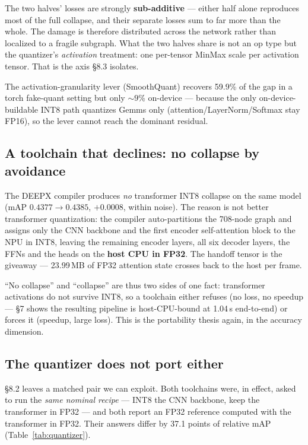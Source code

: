 \documentclass[11pt]{article}
\begin{document}
The two halves' losses are strongly \textbf{sub-additive} --- either half alone reproduces most of the full collapse, and their separate losses sum to far more than the whole. The damage is therefore distributed across the network rather than localized to a fragile subgraph. What the two halves share is not an op type but the quantizer's \emph{activation} treatment: one per-tensor MinMax scale per activation tensor. That is the axis \S8.3 isolates.

The activation-granularity lever (SmoothQuant) recovers 59.9\% of the gap in a torch fake-quant setting but only ${\sim}9$\% on-device --- because the only on-device-buildable INT8 path quantizes Gemms only (attention/LayerNorm/Softmax stay FP16), so the lever cannot reach the dominant residual.

\subsection{A toolchain that declines: no collapse by avoidance}

The DEEPX compiler produces \emph{no} transformer INT8 collapse on the same model (mAP $0.4377 \rightarrow 0.4385$, $+0.0008$, within noise). The reason is not better transformer quantization: the compiler auto-partitions the 708-node graph and assigns only the CNN backbone and the first encoder self-attention block to the NPU in INT8, leaving the remaining encoder layers, all six decoder layers, the FFNs and the heads on the \textbf{host CPU in FP32}. The handoff tensor is the giveaway --- 23.99\,MB of FP32 attention state crosses back to the host per frame.

``No collapse'' and ``collapse'' are thus two sides of one fact: transformer activations do not survive INT8, so a toolchain either refuses (no loss, no speedup --- \S7 shows the resulting pipeline is host-CPU-bound at 1.04\,s end-to-end) or forces it (speedup, large loss). This is the portability thesis again, in the accuracy dimension.

\subsection{The quantizer does not port either}

\S8.2 leaves a matched pair we can exploit. Both toolchains were, in effect, asked to run the \emph{same nominal recipe} --- INT8 the CNN backbone, keep the transformer in FP32 --- and both report an FP32 reference computed with the transformer in FP32. Their answers differ by 37.1 points of relative mAP (Table~\ref{tab:quantizer}).
\end{document}
